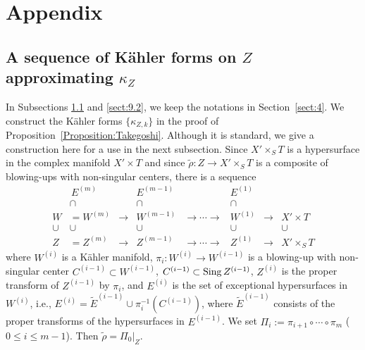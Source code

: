 \documentclass[amscd, leqno]{amsart}
\theoremstyle{plain}
\theoremstyle{definition}
\theoremstyle{remark}
\begin{document}
\section
{Appendix}
\label{sect:9}
\par


\subsection
{A sequence of K\"ahler forms on $Z$ approximating $\kappa_{Z}$}
\label{sect:9.1}
\par
In Subsections \ref{sect:9.1} and \ref{sect:9.2}, we keep the notations in Section~\ref{sect:4}. 
We construct the K\"ahler forms $\{\kappa_{Z,k}\}$ in the proof of Proposition~\ref{Proposition:Takegoshi}.
Although it is standard, we give a construction here for a use in the next subsection.
Since $X' \times_{S} T$ is a hypersurface in the complex manifold $X' \times T$ and 
since $\widetilde{\rho} \colon Z \to X'\times_{S}T$ is a composite of blowing-ups with non-singular centers, there is a sequence 
$$
\begin{matrix}
\, & \, E^{(m)} & \, & E^{(m-1)} & \, & E^{(1)} & \, & \,
\\
\, & \cap &\, &\cap &\, &\cap &\, &\,
\\
W &= W^{(m)} & \to & W^{(m-1)} & \to\cdots\to & W^{(1)} & \to & X' \times T
\\
\cup & \cup &\, &\cup &\, &\cup &\, &\cup
\\
Z &= Z^{(m)} & \to & Z^{(m-1)} & \to\cdots\to & Z^{(1)} &\to & X' \times_{S}T
\end{matrix}
$$
where $W^{(i)}$ is a K\"ahler manifold, $\pi_{i}\colon W^{(i)}\to W^{(i-1)}$ is a blowing-up with non-singular center 
$C^{(i-1)}\subset W^{(i-1)}$, $C^{(i-1)} \subset {\rm Sing}\,Z^{(i-1)}$, $Z^{(i)}$ is the proper transform of $Z^{(i-1)}$ by $\pi_{i}$, 
and $E^{(i)}$ is the set of exceptional hypersurfaces in $W^{(i)}$, i.e., $E^{(i)} = \widetilde{E}^{(i-1)} \cup \pi_{i}^{-1}(C^{(i-1)})$, 
where $\widetilde{E}^{(i-1)}$ consists of the proper transforms of the hypersurfaces in $E^{(i-1)}$.
We set $\varPi_{i} := \pi_{i+1} \circ\cdots\circ \pi_{m}$ ($0 \leq i \leq m-1$). Then $\widetilde{\rho} = \varPi_{0}|_{Z}$. 
\end{document}
